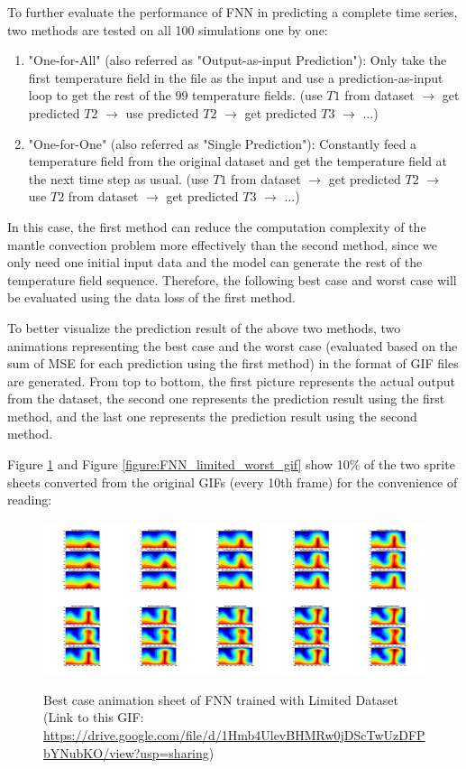 To further evaluate the performance of FNN in predicting a complete time series, two methods are tested on all 100 simulations one by one: 

\begin{enumerate}
  \item "One-for-All" (also referred as "Output-as-input Prediction"): Only take the first temperature field in the file as the input and use a prediction-as-input loop to get the rest of the 99 temperature fields. (use $T1$ from dataset $\rightarrow$ get predicted $T2$ $\rightarrow$ use predicted $T2$ $\rightarrow$ get predicted $T3$ $\rightarrow$ ...)
  \item "One-for-One" (also referred as "Single Prediction"): Constantly feed a temperature field from the original dataset and get the temperature field at the next time step as usual. (use $T1$ from dataset $\rightarrow$ get predicted $T2$ $\rightarrow$ use $T2$ from dataset $\rightarrow$ get predicted $T3$ $\rightarrow$ ...)
\end{enumerate}

In this case, the first method can reduce the computation complexity of the mantle convection problem more effectively than the second method, since we only need one initial input data and the model can generate the rest of the temperature field sequence. Therefore, the following best case and worst case will be evaluated using the data loss of the first method.

To better visualize the prediction result of the above two methods, two animations representing the best case and the worst case (evaluated based on the sum of MSE for each prediction using the first method) in the format of GIF files are generated. From top to bottom, the first picture represents the actual output from the dataset, the second one represents the prediction result using the first method, and the last one represents the prediction result using the second method.

Figure \ref{figure:FNN_limited_best_gif} and Figure \ref{figure:FNN_limited_worst_gif} show 10\% of the two sprite sheets converted from the original GIFs (every 10th frame) for the convenience of reading:

\begin{figure}[H]
    \centering
    \caption{Best case animation sheet of FNN trained with Limited Dataset (Link to this GIF: \url{https://drive.google.com/file/d/1Hmb4UlevBHMRw0jDScTwUzDFPbYNubKO/view?usp=sharing})}
    \includegraphics[scale=0.10]{figures/mantle_convection_images/limited_dataset/FNN_Best_GIF_sheet.png}
    \label{figure:FNN_limited_best_gif}
\end{figure}

